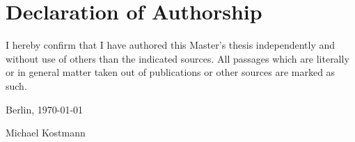
\section*{Declaration of Authorship}

I hereby confirm that I have authored this Master's
thesis independently and without use of others than the indicated
sources. All passages which are literally or in general matter
taken out of publications or other sources are marked as such.
\\\vspace{0.5cm}

\noindent Berlin, \today \\\vspace{0.1cm}

\noindent Michael Kostmann
